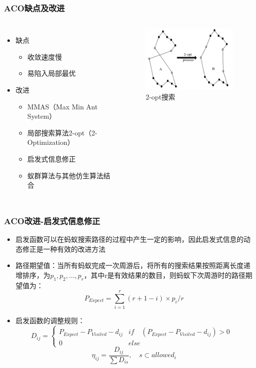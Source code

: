 \begin{frame}
	\frametitle{ACO缺点及改进}
	\begin{columns}
		\begin{itemize}
		\item {缺点}
			\begin{itemize}
				\item {收敛速度慢}
				\item {易陷入局部最优}
			\end{itemize}
		\item {改进}
			\begin{itemize}
				\item {MMAS（Max Min Ant System）}
				\item {局部搜索算法2-opt（2-Optimization）}
				\item {启发式信息修正}
				\item {蚁群算法与其他仿生算法结合}
			\end{itemize}
		\end{itemize}
		\begin{figure}[htbp]
			\centering
			\includegraphics[width=6cm]{pic/ant5.jpg}
			\caption{2-opt搜索}
		\end{figure}
	\end{columns}
\end{frame}


\begin{frame}
	\frametitle{ACO改进-启发式信息修正}
	\begin{itemize}
		\item {启发函数可以在蚂蚁搜索路径的过程中产生一定的影响，因此启发式信息的动态修正是一种有效的改进方法}
		\item {路径期望值：当所有蚂蚁完成一次周游后，将所有的搜索结果按照距离长度递增排序，为$p_1,p_2,…,p_r$，其中r是有效结果的数目，则蚂蚁下次周游时的路径期望值为：$$ P_{Expect}= \sum_{i=1}^{r} (r+1-i)\times p_i/r $$}
		\item {启发函数的调整规则：
		$$
		D_{ij} =
		\begin{cases}
		P_{Expect}-P_{Visited}-d_{ij}  & \text{$if\quad (P_{Expect}-P_{Visited}-d_{ij})>0$ } \\
		0 & \text{$else$}
		\end{cases}
		$$
		$$ \eta_{ij} = \frac{D_{ij}}{\sum D_{is}},\quad s\subset allowed_i$$}
	\end{itemize}
\end{frame}


